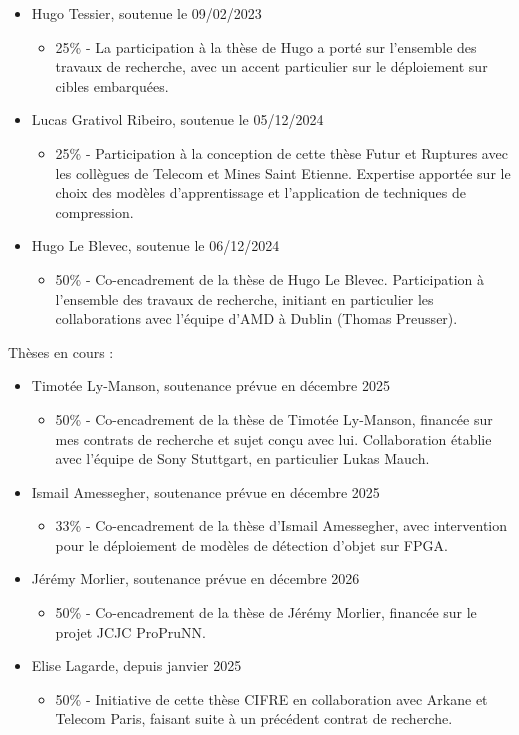 \documentclass[11pt]{report}
\begin{document}
\begin{itemize}
    \item Hugo Tessier, soutenue le 09/02/2023
    \begin{itemize}
      \item 25\% - La participation à la thèse de Hugo a porté sur l'ensemble des travaux de recherche, avec un accent particulier sur le déploiement sur cibles embarquées.
    \end{itemize}
    \item Lucas Grativol Ribeiro, soutenue le 05/12/2024
    \begin{itemize}
      \item 25\% - Participation à la conception de cette thèse Futur et Ruptures avec les collègues de Telecom et Mines Saint Etienne. Expertise apportée sur le choix des modèles d'apprentissage et l'application de techniques de compression.
    \end{itemize}
    \item Hugo Le Blevec, soutenue le 06/12/2024
    \begin{itemize}
      \item 50\% - Co-encadrement de la thèse de Hugo Le Blevec. Participation à l'ensemble des travaux de recherche, initiant en particulier les collaborations avec l'équipe d'AMD à Dublin (Thomas Preusser).
    \end{itemize}
\end{itemize}
Thèses en cours :
\begin{itemize}
    \item Timotée Ly-Manson, soutenance prévue en décembre 2025
    \begin{itemize}
      \item 50\% - Co-encadrement de la thèse de Timotée Ly-Manson, financée sur mes contrats de recherche et sujet conçu avec lui. Collaboration établie avec l'équipe de Sony Stuttgart, en particulier Lukas Mauch.
    \end{itemize}
    \item Ismail Amessegher, soutenance prévue en décembre 2025
    \begin{itemize}
      \item 33\% - Co-encadrement de la thèse d'Ismail Amessegher, avec intervention pour le déploiement de modèles de détection d'objet sur FPGA.
    \end{itemize}
    \item Jérémy Morlier, soutenance prévue en décembre 2026
    \begin{itemize}
      \item 50\% - Co-encadrement de la thèse de Jérémy Morlier, financée sur le projet JCJC ProPruNN.
    \end{itemize}
    \item Elise Lagarde, depuis janvier 2025
    \begin{itemize}
      \item 50\% - Initiative de cette thèse CIFRE en collaboration avec Arkane et Telecom Paris, faisant suite à un précédent contrat de recherche.
    \end{itemize}
\end{itemize}
\end{document}
